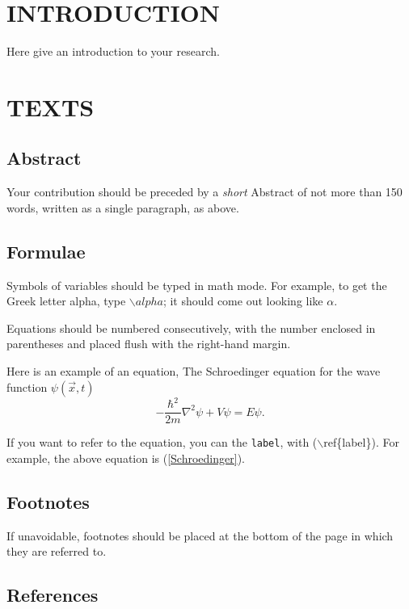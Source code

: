 \documentclass{article}
\begin{document}
\section{INTRODUCTION}

Here give an introduction to your research.

\section{TEXTS}
 
\subsection{Abstract}

Your contribution should  be preceded by a {\it short} Abstract
of not more than 150 words,
written as a single paragraph, as above.

\subsection{Formulae}

Symbols of variables should  be typed in math mode.
For example, to get the Greek letter alpha,
type $\backslash{alpha}$; it should come out looking
like $\alpha$.

Equations should be numbered consecutively, with the 
number enclosed in parentheses and placed flush with
the right-hand margin.

Here is an example of an equation, The Schroedinger
equation for the wave function $\psi(\vec{x},t)$
\begin{equation}\label{Schroedinger}
-\frac{\hbar^{2}}{2m}\nabla^{2}\psi+V\psi=E\psi.
\end{equation}

If you want to refer to the equation, you can
the {\tt label}, with ($\backslash$ref\{label\}).
For example, the above equation is (\ref{Schroedinger}).

\subsection{Footnotes}

If unavoidable, footnotes should be placed at the bottom
of the page in which they are referred to.

\subsection{References}
\end{document}
